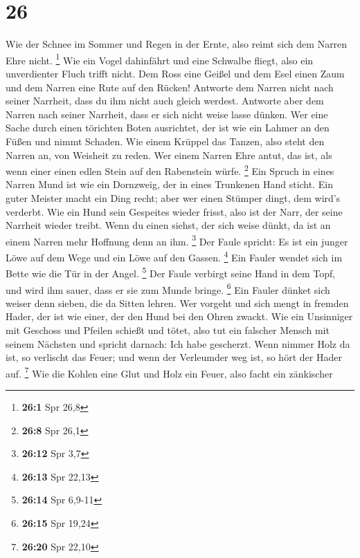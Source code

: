 \hypertarget{section-25}{%
\section{26}\label{section-25}}

 Wie der Schnee im Sommer und Regen in der Ernte, also
reimt sich dem Narren Ehre nicht. \footnote{\textbf{26:1} Spr 26,8}
 Wie ein Vogel dahinfährt und eine Schwalbe fliegt, also
ein unverdienter Fluch trifft nicht.  Dem Ross eine Geißel
und dem Esel einen Zaum und dem Narren eine Rute auf den Rücken!
 Antworte dem Narren nicht nach seiner Narrheit, dass du
ihm nicht auch gleich werdest.  Antworte aber dem Narren
nach seiner Narrheit, dass er sich nicht weise lasse dünken.
 Wer eine Sache durch einen törichten Boten ausrichtet,
der ist wie ein Lahmer an den Füßen und nimmt Schaden. 
Wie einem Krüppel das Tanzen, also steht den Narren an, von Weisheit zu
reden.  Wer einem Narren Ehre antut, das ist, als wenn
einer einen edlen Stein auf den Rabenstein würfe. \footnote{\textbf{26:8}
  Spr 26,1}  Ein Spruch in eines Narren Mund ist wie ein
Dornzweig, der in eines Trunkenen Hand sticht.  Ein guter
Meister macht ein Ding recht; aber wer einen Stümper dingt, dem wird's
verderbt.  Wie ein Hund sein Gespeites wieder frisst,
also ist der Narr, der seine Narrheit wieder treibt. 
Wenn du einen siehst, der sich weise dünkt, da ist an einem Narren mehr
Hoffnung denn an ihm. \footnote{\textbf{26:12} Spr 3,7} 
Der Faule spricht: Es ist ein junger Löwe auf dem Wege und ein Löwe auf
den Gassen. \footnote{\textbf{26:13} Spr 22,13}  Ein
Fauler wendet sich im Bette wie die Tür in der Angel. \footnote{\textbf{26:14}
  Spr 6,9-11}  Der Faule verbirgt seine Hand in dem Topf,
und wird ihm sauer, dass er sie zum Munde bringe. \footnote{\textbf{26:15}
  Spr 19,24}  Ein Fauler dünket sich weiser denn sieben,
die da Sitten lehren.  Wer vorgeht und sich mengt in
fremden Hader, der ist wie einer, der den Hund bei den Ohren zwackt.
 Wie ein Unsinniger mit Geschoss und Pfeilen schießt und
tötet,  also tut ein falscher Mensch mit seinem Nächsten
und spricht darnach: Ich habe gescherzt.  Wenn nimmer
Holz da ist, so verlischt das Feuer; und wenn der Verleumder weg ist, so
hört der Hader auf. \footnote{\textbf{26:20} Spr 22,10} 
Wie die Kohlen eine Glut und Holz ein Feuer, also facht ein zänkischer
